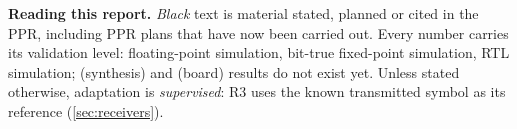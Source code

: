 \noindent\textbf{Reading this report.} \emph{Black} text is material stated, planned or cited in the PPR, including PPR plans that have now been carried out.  Every number carries its validation level:  floating-point simulation,  bit-true fixed-point simulation,  RTL simulation;  (synthesis) and  (board) results do not exist yet. Unless stated otherwise, adaptation is \emph{supervised}: R3 uses the known transmitted symbol as its reference (\cref{sec:receivers}).
